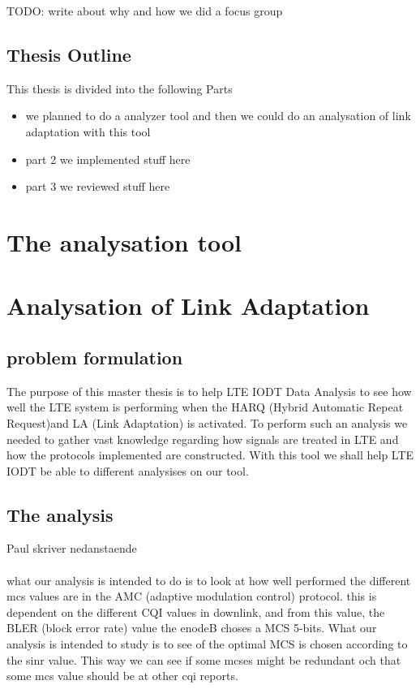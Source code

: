 \documentclass[cropmarks, frame, english]{idamasterthesis}
\begin{document}
TODO: write about why and how we did a focus group

\section{Thesis Outline}
This thesis is divided into the following Parts
\begin{itemize}
	\item we planned to do a analyzer tool and then we could do an analysation of link adaptation with this tool
	\item part 2 we implemented stuff here
	\item part 3 we reviewed stuff here
\end{itemize}

\chapter{The analysation tool}
\chapter{Analysation of Link Adaptation}

\section{problem formulation}
The purpose of this master thesis is to help LTE IODT Data Analysis to see how well the LTE system is performing when the HARQ (Hybrid Automatic Repeat Request)and LA (Link Adaptation) is activated. To perform such an analysis we needed to gather vast knowledge regarding how signals are treated in LTE and how the protocols implemented are constructed. With this tool we shall help LTE IODT be able to different analysises on our tool. 

\section{The analysis}
Paul skriver nedanstaende \\ \\
what our analysis is intended to do is to look at how well performed the different mcs values are in the AMC (adaptive modulation control) protocol. this is dependent on the different CQI values in downlink, and from this value, the BLER (block error rate) value the enodeB choses a MCS 5-bits. What our analysis is intended to study is to see of the optimal MCS is chosen according to the sinr value. This way we can see if some mcses might be redundant och that some mcs value should be at other cqi reports. 
\end{document}
